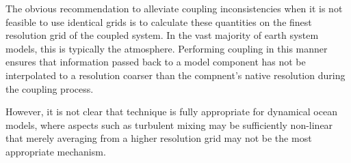 \documentclass[draft,ms]{AGUTeX}
\begin{document}
\begin{article}
The obvious recommendation to alleviate coupling inconsistencies when it is not feasible to use identical grids is to calculate these quantities on the finest resolution grid of the coupled system. In the vast majority of earth system models, this is typically the atmosphere. Performing coupling in this manner ensures that information passed back to a model component has not be interpolated to a resolution coarser than the compnent's native resolution during the coupling process.

However, it is not clear that technique is fully appropriate for dynamical ocean models, where aspects such as turbulent mixing may be sufficiently non-linear that merely averaging from a higher resolution grid may not be the most appropriate mechanism.





%
%


\end{article}
\end{document}
